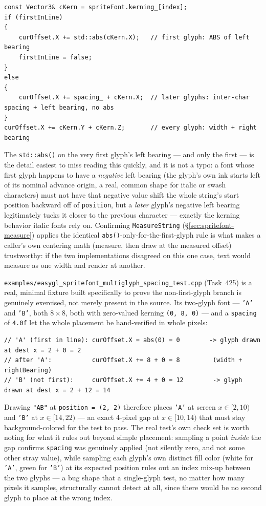 \begin{lstlisting}
const Vector3& cKern = spriteFont.kerning_[index];
if (firstInLine)
{
    curOffset.X += std::abs(cKern.X);   // first glyph: ABS of left bearing
    firstInLine = false;
}
else
{
    curOffset.X += spacing_ + cKern.X;  // later glyphs: inter-char spacing + left bearing, no abs
}
curOffset.X += cKern.Y + cKern.Z;       // every glyph: width + right bearing
\end{lstlisting}

The \texttt{std::abs()} on the very first glyph's left bearing --- and only the first --- is the
detail easiest to miss reading this quickly, and it is not a typo: a font whose first glyph
happens to have a \emph{negative} left bearing (the glyph's own ink starts left of its nominal
advance origin, a real, common shape for italic or swash characters) must not have that negative
value shift the whole string's start position backward off of \texttt{position}, but a
\emph{later} glyph's negative left bearing legitimately tucks it closer to the previous
character --- exactly the kerning behavior italic fonts rely on. Confirming \texttt{MeasureString}
(\S\ref{sec:spritefont-measure}) applies the identical \texttt{abs()}-only-for-the-first-glyph
rule is what makes a caller's own centering math (measure, then draw at the measured offset)
trustworthy: if the two implementations disagreed on this one case, text would measure as one
width and render at another.

\texttt{examples/easygl\_spritefont\_multiglyph\_spacing\_test.cpp} (Task~425) is a real,
minimal fixture built specifically to prove the non-first-glyph branch is genuinely exercised,
not merely present in the source. Its two-glyph font --- \texttt{'A'} and \texttt{'B'}, both
$8\times8$, both with zero-valued kerning \texttt{(0, 8, 0)} --- and a \texttt{spacing} of
\texttt{4.0f} let the whole placement be hand-verified in whole pixels:

\begin{lstlisting}
// 'A' (first in line): curOffset.X = abs(0) = 0        -> glyph drawn at dest x = 2 + 0 = 2
// after 'A':           curOffset.X += 8 + 0 = 8         (width + rightBearing)
// 'B' (not first):     curOffset.X += 4 + 0 = 12        -> glyph drawn at dest x = 2 + 12 = 14
\end{lstlisting}

Drawing \texttt{"AB"} at \texttt{position = (2, 2)} therefore places \texttt{'A'} at screen
$x \in [2, 10)$ and \texttt{'B'} at $x \in [14, 22)$ --- an exact 4-pixel gap at $x \in [10, 14)$
that must stay background-colored for the test to pass. The real test's own check set is worth
noting for what it rules out beyond simple placement: sampling a point \emph{inside} the gap
confirms \texttt{spacing} was genuinely applied (not silently zero, and not some other stray
value), while sampling each glyph's own distinct fill color (white for \texttt{'A'}, green for
\texttt{'B'}) at its expected position rules out an index mix-up between the two glyphs ---
a bug shape that a single-glyph test, no matter how many pixels it samples, structurally cannot
detect at all, since there would be no second glyph to place at the wrong index.

